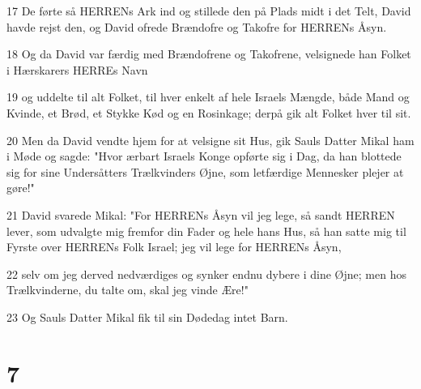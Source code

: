 \par 17 De førte så HERRENs Ark ind og stillede den på Plads midt i det Telt, David havde rejst den, og David ofrede Brændofre og Takofre for HERRENs Åsyn.
\par 18 Og da David var færdig med Brændofrene og Takofrene, velsignede han Folket i Hærskarers HERREs Navn
\par 19 og uddelte til alt Folket, til hver enkelt af hele Israels Mængde, både Mand og Kvinde, et Brød, et Stykke Kød og en Rosinkage; derpå gik alt Folket hver til sit.
\par 20 Men da David vendte hjem for at velsigne sit Hus, gik Sauls Datter Mikal ham i Møde og sagde: "Hvor ærbart Israels Konge opførte sig i Dag, da han blottede sig for sine Undersåtters Trælkvinders Øjne, som letfærdige Mennesker plejer at gøre!"
\par 21 David svarede Mikal: "For HERRENs Åsyn vil jeg lege, så sandt HERREN lever, som udvalgte mig fremfor din Fader og hele hans Hus, så han satte mig til Fyrste over HERRENs Folk Israel; jeg vil lege for HERRENs Åsyn,
\par 22 selv om jeg derved nedværdiges og synker endnu dybere i dine Øjne; men hos Trælkvinderne, du talte om, skal jeg vinde Ære!"
\par 23 Og Sauls Datter Mikal fik til sin Dødedag intet Barn.

\chapter{7}

